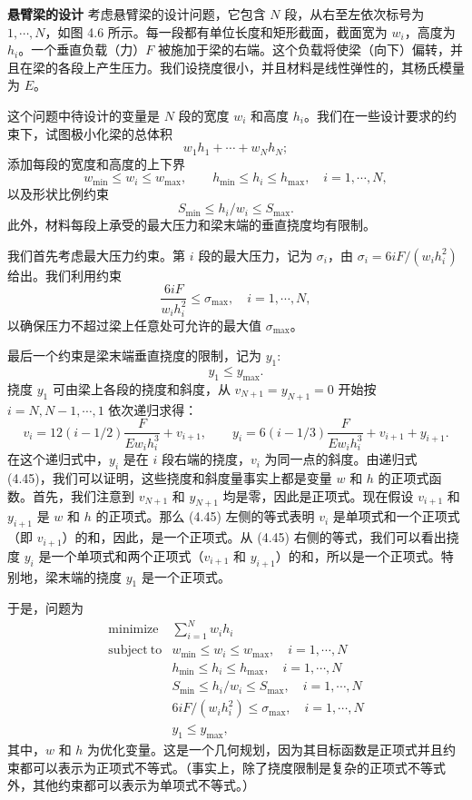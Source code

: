\documentclass[UTF8, 12pt, fontset=fandol, oneside]{ctexart}
\begin{document}
\noindent\textbf{悬臂梁的设计}\quad
考虑悬臂梁的设计问题，它包含 $N$ 段，从右至左依次标号为 $1,\cdots,N$，如图 4.6 所示。每一段都有单位长度和矩形截面，截面宽为 $w_i$，高度为 $h_i$。一个垂直负载（力）$F$ 被施加于梁的右端。这个负载将使梁（向下）偏转，并且在梁的各段上产生压力。我们设挠度很小，并且材料是线性弹性的，其杨氏模量为 $E$。

这个问题中待设计的变量是 $N$ 段的宽度 $w_i$ 和高度 $h_i$。我们在一些设计要求的约束下，试图极小化梁的总体积
\[
w_1h_1+\cdots+w_Nh_N;
\]
添加每段的宽度和高度的上下界
\[
w_{\min}\leq w_i\leq w_{\max},\qquad
h_{\min}\leq h_i\leq h_{\max},\quad i=1,\cdots,N,
\]
以及形状比例约束
\[
S_{\min}\leq h_i/w_i\leq S_{\max}.
\]
此外，材料每段上承受的最大压力和梁末端的垂直挠度均有限制。

我们首先考虑最大压力约束。第 $i$ 段的最大压力，记为 $\sigma_i$，由 $\sigma_i=6iF/(w_ih_i^2)$ 给出。我们利用约束
\[
\frac{6iF}{w_ih_i^2}\leq \sigma_{\max},\quad i=1,\cdots,N,
\]
以确保压力不超过梁上任意处可允许的最大值 $\sigma_{\max}$。

最后一个约束是梁末端垂直挠度的限制，记为 $y_1$:
\[
y_1\leq y_{\max}.
\]
挠度 $y_1$ 可由梁上各段的挠度和斜度，从 $v_{N+1}=y_{N+1}=0$ 开始按 $i=N,N-1,\cdots,1$ 依次递归求得：
\begin{equation}
v_i=12(i-1/2)\frac{F}{Ew_ih_i^3}+v_{i+1},\qquad
y_i=6(i-1/3)\frac{F}{Ew_ih_i^3}+v_{i+1}+y_{i+1}.
\tag{4.45}
\end{equation}
在这个递归式中，$y_i$ 是在 $i$ 段右端的挠度，$v_i$ 为同一点的斜度。由递归式 (4.45)，我们可以证明，这些挠度和斜度量事实上都是变量 $w$ 和 $h$ 的正项式函数。首先，我们注意到 $v_{N+1}$ 和 $y_{N+1}$ 均是零，因此是正项式。现在假设 $v_{i+1}$ 和 $y_{i+1}$ 是 $w$ 和 $h$ 的正项式。那么 (4.45) 左侧的等式表明 $v_i$ 是单项式和一个正项式（即 $v_{i+1}$）的和，因此，是一个正项式。从 (4.45) 右侧的等式，我们可以看出挠度 $y_i$ 是一个单项式和两个正项式（$v_{i+1}$ 和 $y_{i+1}$）的和，所以是一个正项式。特别地，梁末端的挠度 $y_1$ 是一个正项式。

于是，问题为
\begin{equation}
\begin{array}{ll}
\mathop{\mathrm{minimize}} & \displaystyle\sum_{i=1}^N w_ih_i\\
\mathrm{subject\ to} & w_{\min}\leq w_i\leq w_{\max},\quad i=1,\cdots,N\\
& h_{\min}\leq h_i\leq h_{\max},\quad i=1,\cdots,N\\
& S_{\min}\leq h_i/w_i\leq S_{\max},\quad i=1,\cdots,N\\
& 6iF/(w_ih_i^2)\leq \sigma_{\max},\quad i=1,\cdots,N\\
& y_1\leq y_{\max},
\end{array}
\tag{4.46}
\end{equation}
其中，$w$ 和 $h$ 为优化变量。这是一个几何规划，因为其目标函数是正项式并且约束都可以表示为正项式不等式。（事实上，除了挠度限制是复杂的正项式不等式外，其他约束都可以表示为单项式不等式。）
\end{document}
